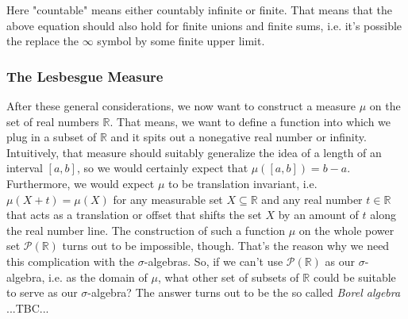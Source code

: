 \medskip
Here "countable" means either countably infinite or finite. That means that the above equation should also hold for finite unions and finite sums, i.e. it's possible the replace the $\infty$ symbol by some finite upper limit.







\subsubsection{The Lesbesgue Measure}
After these general considerations, we now want to construct a measure $\mu$ on the set of real numbers $\mathbb{R}$. That means, we want to define a function into which we plug in a subset of $\mathbb{R}$ and it spits out a nonegative real number or infinity. Intuitively, that measure should suitably generalize the idea of a length of an interval $[a,b]$, so we would certainly expect that $\mu([a,b]) = b-a$. Furthermore, we would expect $\mu$ to be translation invariant, i.e. $\mu(X + t) = \mu(X)$ for any measurable set $X \subseteq \mathbb{R}$ and any real number $t \in \mathbb{R}$ that acts as a translation or offset that shifts the set $X$ by an amount of $t$ along the real number line. The construction of such a function $\mu$ on the whole power set $\mathcal{P}(\mathbb{R})$ turns out to be impossible, though. That's the reason why we need this complication with the $\sigma$-algebras. So, if we can't use $\mathcal{P}(\mathbb{R})$ as our $\sigma$-algebra, i.e. as the domain of $\mu$, what other set of subsets of $\mathbb{R}$ could be suitable to serve as our $\sigma$-algebra? The answer turns out to be the so called \emph{Borel algebra} ...TBC...

